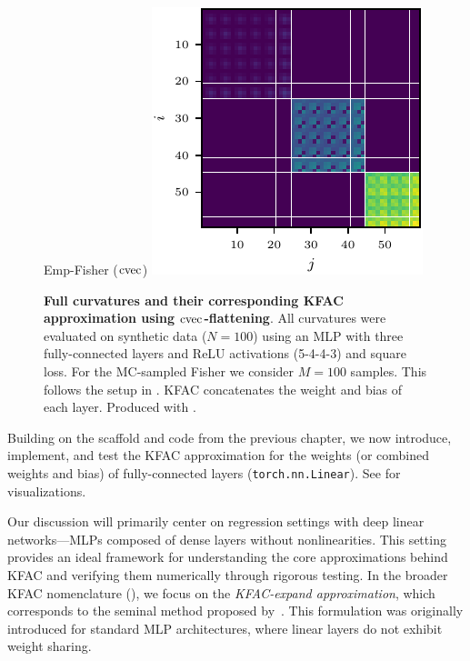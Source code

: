 \begin{figure}[!h]
\begin{minipage}[t]{0.485\linewidth}
  \end{minipage}
  \hfill
  \begin{minipage}[t]{0.485\linewidth}
    \centering
    Emp-Fisher ($\operatorname{cvec}$)\vspace{1ex}
    \includegraphics[width=1.0\linewidth]{../kfs/plots/synthetic_cvec_empfisher_kfac.pdf}
  \end{minipage}
  \caption{\textbf{Full curvatures and their corresponding KFAC approximation using $\operatorname{cvec}$-flattening}.
    All curvatures were evaluated on synthetic data ($N = 100$) using an MLP with three fully-connected layers and ReLU activations (5-4-4-3) and square loss.
    For the MC-sampled Fisher we consider $M = 100$ samples.
    This follows the setup in .
    KFAC concatenates the weight and bias of each layer.
    Produced with .}
  \label{fig:cvec-kfac-full-comparison}
\end{figure}
\switchcolumn[0]

Building on the scaffold and code from the previous chapter, we now introduce, implement, and test the KFAC approximation for the weights (or combined weights and bias) of fully-connected layers (\texttt{torch.nn.Linear}).
See  for visualizations.

Our discussion will primarily center on regression settings with deep linear networks---MLPs composed of dense layers without nonlinearities.
This setting provides an ideal framework for understanding the core approximations behind KFAC and verifying them numerically through rigorous testing.
In the broader KFAC nomenclature (), we focus on the \emph{KFAC-expand approximation}, which corresponds to the seminal method proposed by~\citet{martens2015optimizing}.
This formulation was originally introduced for standard MLP architectures, where linear layers do not exhibit weight sharing.

